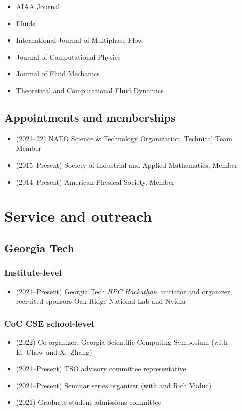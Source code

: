 \begin{itemize}
    \item AIAA Journal
    \item Fluids
    \item International Journal of Multiphase Flow
    \item Journal of Computational Physics
    \item Journal of Fluid Mechanics
    \item Theoretical and Computational Fluid Dynamics
\end{itemize}

\subsection{Appointments and memberships}

\begin{itemize}
    \item (2021--22) NATO Science \& Technology Organization, Technical Team Member
    \item (2015--Present) Society of Industrial and Applied Mathematics, Member
    \item (2014--Present) American Physical Society, Member
\end{itemize}

\section{Service and outreach}

\subsection{Georgia Tech}

\subsubsection{Institute-level}
\begin{itemize}
    \item (2021--Present) Georgia Tech \textit{HPC Hackathon}, initiator and organizer, recruited sponsors Oak Ridge National Lab and Nvidia 
\end{itemize}

\subsubsection{CoC CSE school-level}
\begin{itemize}
    \item (2022) Co-organizer, Georgia Scientific Computing Symposium (with E.\ Chow and X.\ Zhang)
    \item (2021--Present) TSO advisory committee representative
    \item (2021--Present) Seminar series organizer (with \Florian and Rich Vuduc)
    \item (2021) Graduate student admissions committee
\end{itemize}

